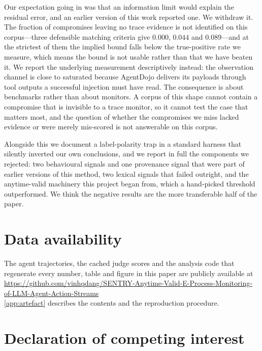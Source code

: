 \documentclass[preprint,12pt,number]{elsarticle}
\theoremstyle{definition}
\begin{document}
Our expectation going in was that an information limit would explain the residual
error, and an earlier version of this work reported one. We withdraw it. The
fraction of compromises leaving no trace evidence is not identified on this
corpus---three defensible matching criteria give $0.000$, $0.044$ and $0.089$---and
at the strictest of them the implied bound falls below the true-positive rate we
measure, which means the bound is not usable rather than that we have beaten it. We
report the underlying measurement descriptively instead: the observation channel is
close to saturated because AgentDojo delivers its payloads through tool outputs a
successful injection must have read. The consequence is about benchmarks rather
than about monitors. A corpus of this shape cannot contain a compromise that is
invisible to a trace monitor, so it cannot test the case that matters most, and the
question of whether the compromises we miss lacked evidence or were merely
mis-scored is not answerable on this corpus.

Alongside this we document a label-polarity trap in a standard harness that
silently inverted our own conclusions, and we report in full the components we
rejected: two behavioural signals and one provenance signal that were part of
earlier versions of this method, two lexical signals that failed outright, and the
anytime-valid machinery this project began from, which a hand-picked threshold
outperformed. We think the negative results are the more
transferable half of the paper.

\section*{Data availability}

The agent trajectories, the cached judge scores and the analysis code that
regenerate every number, table and figure in this paper are publicly available
at\\
\url{https://github.com/vinhqdang/SENTRY-Anytime-Valid-E-Process-Monitoring-of-LLM-Agent-Action-Streams}\\
\ref{app:artefact} describes the contents and the reproduction procedure.

\section*{Declaration of competing interest}
\end{document}
